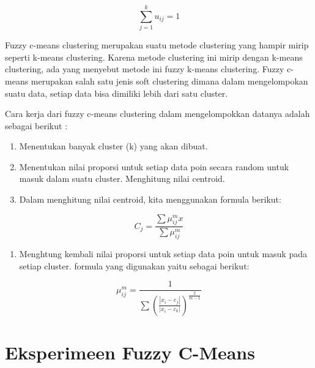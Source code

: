 \documentclass[
]{elegantbook}
\providecommand{\tightlist}{%
  \setlength{\itemsep}{0pt}\setlength{\parskip}{0pt}}
\begin{document}
\begin{theorem}
\protect\hypertarget{thm:unnamed-chunk-1}{}\label{thm:unnamed-chunk-1}\[\sum_{j=1}^k u_{i j}=1\]
\end{theorem}

Fuzzy c-means clustering merupakan suatu metode clustering yang hampir mirip seperti k-means clustering. Karena metode clustering ini mirip dengan k-means clustering, ada yang menyebut metode ini fuzzy k-means clustering. Fuzzy c-means merupakan salah satu jenis soft clustering dimana dalam mengelompokan suatu data, setiap data bisa dimiliki lebih dari satu cluster.

Cara kerja dari fuzzy c-means clustering dalam mengelompokkan datanya adalah sebagai berikut :

\begin{enumerate}
\def\labelenumi{\arabic{enumi}.}
\item
  Menentukan banyak cluster (k) yang akan dibuat.
\item
  Menentukan nilai proporsi untuk setiap data poin secara random untuk masuk dalam suatu cluster. Menghitung nilai centroid.
\item
  Dalam menghitung nilai centroid, kita menggunakan formula berikut:
\end{enumerate}

\begin{lemma}
\protect\hypertarget{lem:unnamed-chunk-2}{}\label{lem:unnamed-chunk-2}\[C_j=\frac{\sum{{\mu }^m_{ij}}x}{\sum{{\mu }^m_{ij}}}\]
\end{lemma}

\begin{enumerate}
\def\labelenumi{\arabic{enumi}.}
\setcounter{enumi}{3}
\tightlist
\item
  Menghtung kembali nilai proporsi untuk setiap data poin untuk masuk pada setiap cluster. formula yang digunakan yaitu sebagai berikut:
\end{enumerate}

\begin{lemma}
\protect\hypertarget{lem:unnamed-chunk-3}{}\label{lem:unnamed-chunk-3}\[{\mu }^m_{ij}=\frac{1}{\sum{{\left(\frac{\left|x_i-c_j\right|}{\left|x_i-c_k\right|}\right)}^{\frac{2}{m-1}}}}\]
\end{lemma}

\hypertarget{eksperimeen-fuzzy-c-means}{%
\section{Eksperimeen Fuzzy C-Means}\label{eksperimeen-fuzzy-c-means}}
\end{document}
